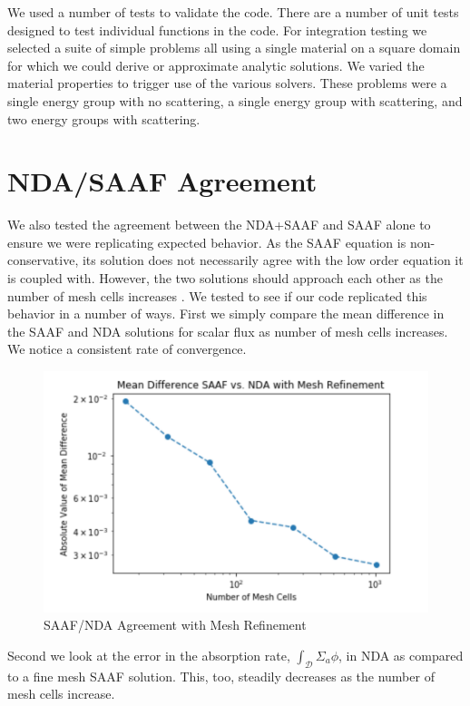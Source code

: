 We used a number of tests to validate the code. There are a number of unit tests designed to test individual functions in the code. For integration testing we selected a suite of simple problems all using a single material on a square domain for which we could derive or approximate analytic solutions. We varied the material properties to trigger use of the various solvers. These problems were a single energy group with no scattering, a single energy group with scattering, and two energy groups with scattering. 

\section{NDA/SAAF Agreement}
We also tested the agreement between the NDA+SAAF and SAAF alone to ensure we were replicating expected behavior. As the SAAF equation is non-conservative, its solution does not necessarily agree with the low order equation it is coupled with. However, the two solutions should approach each other as the number of mesh cells increases \cite{Wang2013}. We tested to see if our code replicated this behavior in a number of ways. First we simply compare the mean difference in the SAAF and NDA solutions for scalar flux as number of mesh cells increases. We notice a consistent rate of convergence. 
\begin{figure}[H]
    \centering
    \includegraphics[width=.75\textwidth]{fig/NDAvsSAAF.png}
    \caption{SAAF/NDA Agreement with Mesh Refinement}
    \label{fig:SAAFvsNDA}
\end{figure}

Second we look at the error in the absorption rate, $\int_\mathcal{D}\Sigma_a\phi$, in NDA as compared to a fine mesh SAAF solution. This, too, steadily decreases as the number of mesh cells increase.

